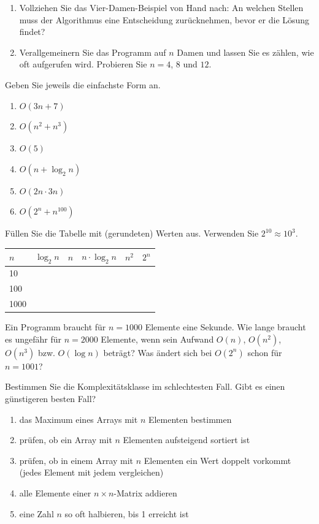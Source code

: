 \begin{enumerate}[label=\alph*)]
\item Vollziehen Sie das Vier-Damen-Beispiel von Hand nach: An welchen Stellen muss der Algorithmus eine Entscheidung zurücknehmen, bevor er die Lösung findet?
\item Verallgemeinern Sie das Programm auf $n$ Damen und lassen Sie es zählen, wie oft  aufgerufen wird. Probieren Sie $n = 4$, $8$ und $12$.
\end{enumerate}

\ueben
{}
Geben Sie jeweils die einfachste Form an.
\begin{multicols}{3}
\begin{enumerate}[label=\alph*)]
\item $O(3n + 7)$
\item $O(n^2 + n^3)$
\item $O(5)$
\item $O(n + \log_2 n)$
\item $O(2n \cdot 3n)$
\item $O(2^n + n^{100})$
\end{enumerate}
\end{multicols}

Füllen Sie die Tabelle mit (gerundeten) Werten aus. Verwenden Sie $2^{10} \approx 10^3$.
\begin{center}
\renewcommand{\arraystretch}{1.4}
\begin{tabular}{|C{1.6cm}|C{2.2cm}|C{2.2cm}|C{2.4cm}|C{2.2cm}|C{2.2cm}|}
\hline
$n$ & $\log_2 n$ & $n$ & $n \cdot \log_2 n$ & $n^2$ & $2^n$ \\  & & & & & \\  & & & & & \\  & & & & & \\ \hline
\end{tabular}
\end{center}

Ein Programm braucht für $n = 1000$ Elemente eine Sekunde. Wie lange braucht es ungefähr für $n = 2000$ Elemente, wenn sein Aufwand $O(n)$, $O(n^2)$, $O(n^3)$ bzw. $O(\log n)$ beträgt? Was ändert sich bei $O(2^n)$ schon für $n = 1001$?

Bestimmen Sie die Komplexitätsklasse im schlechtesten Fall. Gibt es einen günstigeren besten Fall?
\begin{enumerate}[label=\alph*)]
\item das Maximum eines Arrays mit $n$ Elementen bestimmen
\item prüfen, ob ein Array mit $n$ Elementen aufsteigend sortiert ist
\item prüfen, ob in einem Array mit $n$ Elementen ein Wert doppelt vorkommt (jedes Element mit jedem vergleichen)
\item alle Elemente einer $n \times n$-Matrix addieren
\item eine Zahl $n$ so oft halbieren, bis 1 erreicht ist
\end{enumerate}

